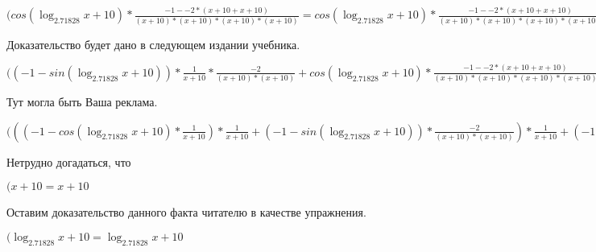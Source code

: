 \documentclass[12pt,a4paper,fleqn]{article}
\theoremstyle{definition}
\begin{document}
$(cos(\log_{ 2.71828 }{ x  +  10 }) * \frac{ -1  -  -2  * ( x  +  10  +  x  +  10 )}{( x  +  10 ) * ( x  +  10 ) * ( x  +  10 ) * ( x  +  10 )}
 = cos(\log_{ 2.71828 }{ x  +  10 }) * \frac{ -1  -  -2  * ( x  +  10  +  x  +  10 )}{( x  +  10 ) * ( x  +  10 ) * ( x  +  10 ) * ( x  +  10 )}
$

Доказательство будет дано в следующем издании учебника.

$(( -1  - sin(\log_{ 2.71828 }{ x  +  10 })) * \frac{ 1 }{ x  +  10 }
 * \frac{ -2 }{( x  +  10 ) * ( x  +  10 )}
 + cos(\log_{ 2.71828 }{ x  +  10 }) * \frac{ -1  -  -2  * ( x  +  10  +  x  +  10 )}{( x  +  10 ) * ( x  +  10 ) * ( x  +  10 ) * ( x  +  10 )}
 = ( -1  - sin(\log_{ 2.71828 }{ x  +  10 })) * \frac{ 1 }{ x  +  10 }
 * \frac{ -2 }{( x  +  10 ) * ( x  +  10 )}
 + cos(\log_{ 2.71828 }{ x  +  10 }) * \frac{ -1  -  -2  * ( x  +  10  +  x  +  10 )}{( x  +  10 ) * ( x  +  10 ) * ( x  +  10 ) * ( x  +  10 )}
$

Тут могла быть Ваша реклама.

$((( -1  - cos(\log_{ 2.71828 }{ x  +  10 }) * \frac{ 1 }{ x  +  10 }
) * \frac{ 1 }{ x  +  10 }
 + ( -1  - sin(\log_{ 2.71828 }{ x  +  10 })) * \frac{ -2 }{( x  +  10 ) * ( x  +  10 )}
) * \frac{ 1 }{ x  +  10 }
 + ( -1  - sin(\log_{ 2.71828 }{ x  +  10 })) * \frac{ 1 }{ x  +  10 }
 * \frac{ -2 }{( x  +  10 ) * ( x  +  10 )}
 + ( -1  - sin(\log_{ 2.71828 }{ x  +  10 })) * \frac{ 1 }{ x  +  10 }
 * \frac{ -2 }{( x  +  10 ) * ( x  +  10 )}
 + cos(\log_{ 2.71828 }{ x  +  10 }) * \frac{ -1  -  -2  * ( x  +  10  +  x  +  10 )}{( x  +  10 ) * ( x  +  10 ) * ( x  +  10 ) * ( x  +  10 )}
 = (( -1  - cos(\log_{ 2.71828 }{ x  +  10 }) * \frac{ 1 }{ x  +  10 }
) * \frac{ 1 }{ x  +  10 }
 + ( -1  - sin(\log_{ 2.71828 }{ x  +  10 })) * \frac{ -2 }{( x  +  10 ) * ( x  +  10 )}
) * \frac{ 1 }{ x  +  10 }
 + ( -1  - sin(\log_{ 2.71828 }{ x  +  10 })) * \frac{ 1 }{ x  +  10 }
 * \frac{ -2 }{( x  +  10 ) * ( x  +  10 )}
 + ( -1  - sin(\log_{ 2.71828 }{ x  +  10 })) * \frac{ 1 }{ x  +  10 }
 * \frac{ -2 }{( x  +  10 ) * ( x  +  10 )}
 + cos(\log_{ 2.71828 }{ x  +  10 }) * \frac{ -1  -  -2  * ( x  +  10  +  x  +  10 )}{( x  +  10 ) * ( x  +  10 ) * ( x  +  10 ) * ( x  +  10 )}
$

Нетрудно догадаться, что

$( x  +  10  =  x  +  10 $

Оставим доказательство данного факта читателю в качестве упражнения.

$(\log_{ 2.71828 }{ x  +  10 } = \log_{ 2.71828 }{ x  +  10 }$
\end{document}

